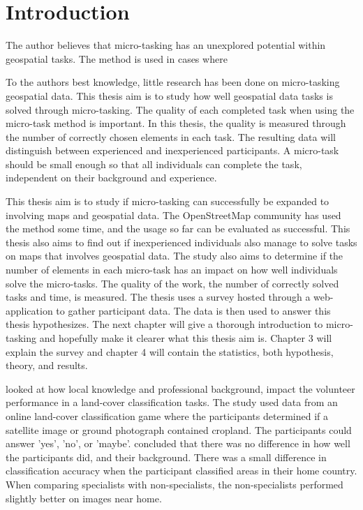 \chapter{Introduction}
The author believes that micro-tasking has an unexplored potential within geospatial tasks. The method is used in cases where 
 
To the authors best knowledge, little research has been done on micro-tasking geospatial data. This thesis aim is to study how well geospatial data tasks is solved through micro-tasking. The quality of each completed task when using the micro-task method is important. In this thesis, the quality is measured through the number of correctly chosen elements in each task. The resulting data will distinguish between experienced and inexperienced participants. A micro-task should be small enough so that all individuals can complete the task, independent on their background and experience. 

This thesis aim is to study if micro-tasking can successfully be expanded to involving maps and geospatial data. The OpenStreetMap community has used the method some time, and the usage so far can be evaluated as successful. %
This thesis also aims to find out if inexperienced individuals also manage to solve tasks on maps that involves geospatial data. The study also aims to determine if the number of elements in each micro-task has an impact on how well individuals solve the micro-tasks. The quality of the work, the number of correctly solved tasks and time, is measured. The thesis uses a survey hosted through a web-application to gather participant data. The data is then used to answer this thesis hypothesizes. The next chapter will give a thorough introduction to micro-tasking and hopefully make it clearer what this thesis aim is. Chapter 3 will explain the survey and chapter 4 will contain the statistics, both hypothesis, theory, and results. 

\cite{Salk2016} looked at how local knowledge and professional background, impact the volunteer performance in a land-cover classification tasks. The study used data from an online land-cover classification game where the participants determined if a satellite image or ground photograph contained cropland. The participants could answer 'yes', 'no', or 'maybe'.  \cite{Salk2016} concluded that there was no difference in how well the participants did, and their background.%
There was a small difference in classification accuracy when the participant classified areas in their home country. When comparing specialists with non-specialists, the non-specialists performed slightly better on images near home. 
 

